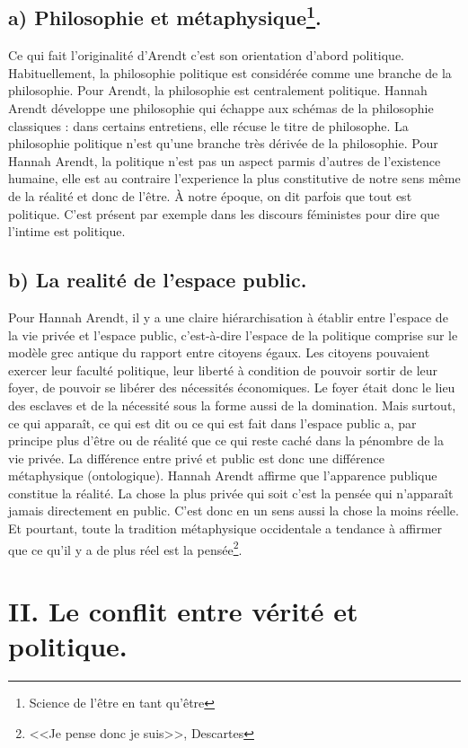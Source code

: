 \documentclass[12pt]{article}
\begin{document}
\subsection*{a) Philosophie et métaphysique\footnote{Science de l'être en tant qu'être}.}
Ce qui fait l'originalité d'Arendt c'est son orientation d'abord politique.
Habituellement, la philosophie politique est considérée comme une branche de la philosophie.
Pour Arendt, la philosophie est centralement politique.
Hannah Arendt développe une philosophie qui échappe aux schémas de la philosophie classiques : dans certains entretiens, elle récuse le titre de philosophe.
La philosophie politique n'est qu'une branche très dérivée de la philosophie.
Pour Hannah Arendt, la politique n'est pas un aspect parmis d'autres de l'existence humaine, elle est au contraire l'experience la plus constitutive de notre sens même de la réalité et donc de l'être.
À notre époque, on dit parfois que tout est politique.
C'est présent par exemple dans les discours féministes pour dire que l'intime est politique.
\subsection*{b) La realité de l'espace public.}
Pour Hannah Arendt, il y a une claire hiérarchisation à établir entre l'espace de la vie privée et l'espace public, c'est-à-dire l'espace de la politique comprise sur le modèle grec antique du rapport entre citoyens égaux.
Les citoyens pouvaient exercer leur faculté politique, leur liberté à condition de pouvoir sortir de leur foyer, de pouvoir se libérer des nécessités économiques. 
Le foyer était donc le lieu des esclaves et de la nécessité sous la forme aussi de la domination.
Mais surtout, ce qui apparaît, ce qui est dit ou ce qui est fait dans l'espace public a, par principe plus d'être ou de réalité que ce qui reste caché dans la pénombre de la vie privée.
La différence entre privé et public est donc une différence métaphysique (ontologique).
Hannah Arendt affirme que l'apparence publique constitue la réalité.
La chose la plus privée qui soit c'est la pensée qui n'apparaît jamais directement en public.
C'est donc en un sens aussi la chose la moins réelle.
Et pourtant, toute la tradition métaphysique occidentale a tendance à affirmer que ce qu'il y a de plus réel est la pensée\footnote{<<Je pense donc je suis>>, Descartes}.

\section*{\color{red}II. Le conflit entre vérité et politique.}
\end{document}
